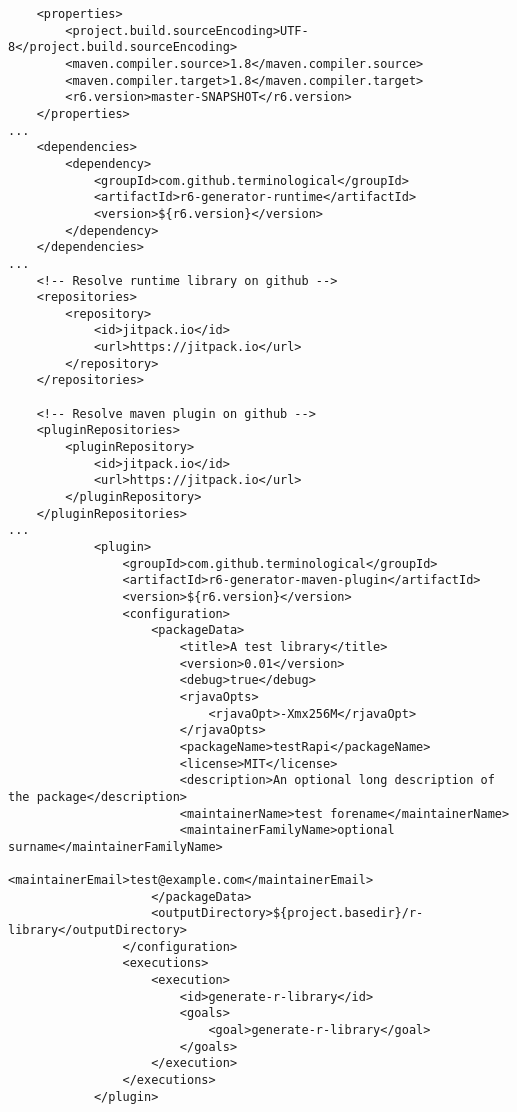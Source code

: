 \documentclass[
]{jss}
\begin{document}
\begin{verbatim}
    <properties>
        <project.build.sourceEncoding>UTF-8</project.build.sourceEncoding>
        <maven.compiler.source>1.8</maven.compiler.source>
        <maven.compiler.target>1.8</maven.compiler.target>
        <r6.version>master-SNAPSHOT</r6.version>
    </properties>
...
    <dependencies>
        <dependency>
            <groupId>com.github.terminological</groupId>
            <artifactId>r6-generator-runtime</artifactId>
            <version>${r6.version}</version>
        </dependency>
    </dependencies>
...
    <!-- Resolve runtime library on github -->
    <repositories>
        <repository>
            <id>jitpack.io</id>
            <url>https://jitpack.io</url>
        </repository>
    </repositories>

    <!-- Resolve maven plugin on github -->
    <pluginRepositories>
        <pluginRepository>
            <id>jitpack.io</id>
            <url>https://jitpack.io</url>
        </pluginRepository>
    </pluginRepositories>
...
            <plugin>
                <groupId>com.github.terminological</groupId>
                <artifactId>r6-generator-maven-plugin</artifactId>
                <version>${r6.version}</version>
                <configuration>
                    <packageData>
                        <title>A test library</title>
                        <version>0.01</version>
                        <debug>true</debug>
                        <rjavaOpts>
                            <rjavaOpt>-Xmx256M</rjavaOpt>
                        </rjavaOpts>
                        <packageName>testRapi</packageName>
                        <license>MIT</license>
                        <description>An optional long description of the package</description>
                        <maintainerName>test forename</maintainerName>
                        <maintainerFamilyName>optional surname</maintainerFamilyName>
                        <maintainerEmail>test@example.com</maintainerEmail>
                    </packageData>
                    <outputDirectory>${project.basedir}/r-library</outputDirectory>
                </configuration>
                <executions>
                    <execution>
                        <id>generate-r-library</id>
                        <goals>
                            <goal>generate-r-library</goal>
                        </goals>
                    </execution>
                </executions>
            </plugin>
\end{verbatim}
\end{document}
